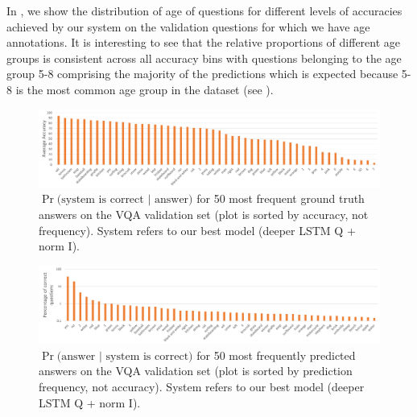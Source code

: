 In , we show the distribution of age of questions for different levels of accuracies achieved by our system on the validation questions for which we have age annotations. It is interesting to see that the relative proportions of different age groups is consistent across all accuracy bins with questions belonging to the age group 5-8 comprising the majority of the predictions which is expected because 5-8 is the most common age group in the dataset (see ).

\begin{figure}[h]
\includegraphics[width=1\linewidth]{figures/prob1_OpenEnded_val2014_sorted.pdf}
\centering
\caption{$\Pr\text{(system is correct } | \text{ answer)}$ for 50 most frequent ground truth answers on the VQA validation set (plot is sorted by accuracy, not frequency). System refers to our best model (deeper LSTM Q + norm I).}
\label{fig:prob_1}
\end{figure}
\begin{figure}[h]
\includegraphics[width=1\linewidth]{figures/prob2_OpenEnded_val2014_100_logscale.pdf}
\centering
\caption{$\Pr\text{(answer } | \text{ system is correct)}$ for 50 most frequently predicted answers on the VQA validation set (plot is sorted by prediction frequency, not accuracy). System refers to our best model (deeper LSTM Q + norm I).}
\label{fig:prob_2}
\end{figure}
